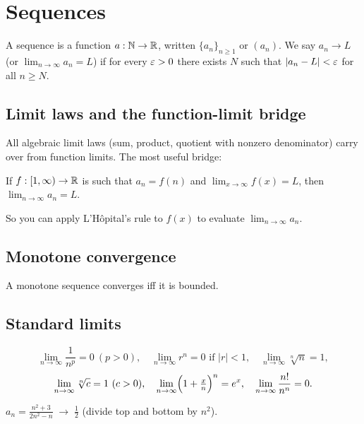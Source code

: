 \section{Sequences}

\begin{definition}[Sequence]
A sequence is a function $a : \mathbb{N} \to \mathbb{R}$, written $\{a_n\}_{n \ge 1}$ or $(a_n)$.
We say $a_n \to L$ (or $\lim_{n\to\infty} a_n = L$) if for every $\varepsilon > 0$ there exists $N$
such that $|a_n - L| < \varepsilon$ for all $n \ge N$.
\end{definition}

\subsection{Limit laws and the function-limit bridge}
All algebraic limit laws (sum, product, quotient with nonzero denominator) carry over
from function limits. The most useful bridge:

\begin{theorem}
If $f : [1,\infty) \to \mathbb{R}$ is such that $a_n = f(n)$ and $\lim_{x\to\infty} f(x) = L$,
then $\lim_{n\to\infty} a_n = L$.
\end{theorem}

So you can apply L'H\^opital's rule to $f(x)$ to evaluate $\lim_{n\to\infty} a_n$.

\subsection{Monotone convergence}
\begin{theorem}
A monotone sequence converges iff it is bounded.
\end{theorem}

\subsection{Standard limits}
\begin{keybox}[Memorize]
\[
\lim_{n\to\infty} \frac{1}{n^p} = 0\ (p > 0), \quad
\lim_{n\to\infty} r^n = 0 \text{ if } |r| < 1, \quad
\lim_{n\to\infty} \sqrt[n]{n} = 1,
\]
\[
\lim_{n\to\infty} \sqrt[n]{c} = 1\ (c > 0), \quad
\lim_{n\to\infty} \Bigl(1 + \tfrac{x}{n}\Bigr)^n = e^x, \quad
\lim_{n\to\infty} \frac{n!}{n^n} = 0.
\]
\end{keybox}

\begin{example}
$\displaystyle a_n = \frac{n^2 + 3}{2n^2 - n} \;\to\; \tfrac{1}{2}$ (divide top and bottom by $n^2$).
\end{example}

